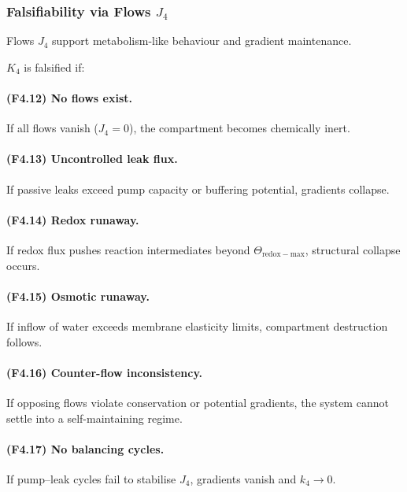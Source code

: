 \subsubsection{Falsifiability via Flows \texorpdfstring{$J_4$}{J_4}}

Flows $J_4$ support metabolism-like behaviour and gradient maintenance.

$K_4$ is falsified if:

\paragraph{(F4.12) No flows exist.}
If all flows vanish ($J_4=0$), the compartment becomes chemically
inert.

\paragraph{(F4.13) Uncontrolled leak flux.}
If passive leaks exceed pump capacity or buffering potential, gradients
collapse.

\paragraph{(F4.14) Redox runaway.}
If redox flux pushes reaction intermediates beyond
$\Theta_{\mathrm{redox-max}}$, structural collapse occurs.

\paragraph{(F4.15) Osmotic runaway.}
If inflow of water exceeds membrane elasticity limits,
compartment destruction follows.

\paragraph{(F4.16) Counter-flow inconsistency.}
If opposing flows violate conservation or potential gradients, the
system cannot settle into a self-maintaining regime.

\paragraph{(F4.17) No balancing cycles.}
If pump–leak cycles fail to stabilise $J_4$, gradients vanish and
$k_4\to 0$.



